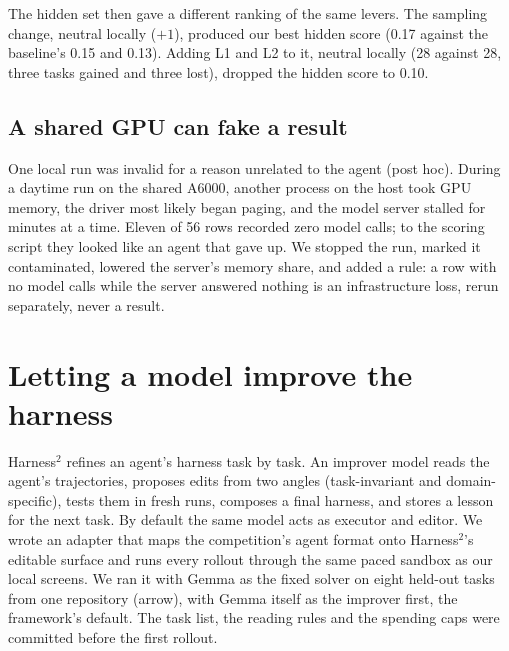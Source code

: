 \documentclass[11pt]{article}
\begin{document}
The hidden set then gave a different ranking of the same levers. The sampling change, neutral locally ($+1$), produced our best
hidden score (0.17 against the baseline's 0.15 and 0.13). Adding L1 and L2 to it, neutral locally (28 against 28, three tasks
gained and three lost), dropped the hidden score to 0.10.

\begin{table}[t]
\centering\small

\caption{Moving the baseline toward the public 0.24 notebook one difference at a time (74 tasks each). A and B are the two
runs compared; ``only A'' counts tasks A solved and B did not.}
\label{tab:steps}
\end{table}

\subsection{A shared GPU can fake a result}
\label{sec:contention}

One local run was invalid for a reason unrelated to the agent (post hoc). During a daytime run on the shared A6000, another
process on the host took GPU memory, the driver most likely began paging, and the model server stalled for minutes at a time.
Eleven of 56 rows recorded zero model calls; to the scoring script they looked like an agent that gave up. We stopped the
run, marked it contaminated, lowered the server's memory share, and added a rule: a row with no model calls while the server
answered nothing is an infrastructure loss, rerun separately, never a result.

\section{Letting a model improve the harness}
\label{sec:harness2}

Harness$^2$ \citep{xu2026harness2} refines an agent's harness task by task. An improver model reads the agent's trajectories,
proposes edits from two angles (task-invariant and domain-specific), tests them in fresh runs, composes a final harness, and
stores a lesson for the next task. By default the same model acts as executor and editor. We wrote an
adapter that maps the competition's agent format onto Harness$^2$'s editable surface and runs every rollout through the same
paced sandbox as our local screens. We ran it with Gemma as the fixed solver on eight held-out tasks from one repository
(arrow), with Gemma itself as the improver first, the framework's default. The task list, the reading rules and the spending
caps were committed before the first rollout.
\end{document}
